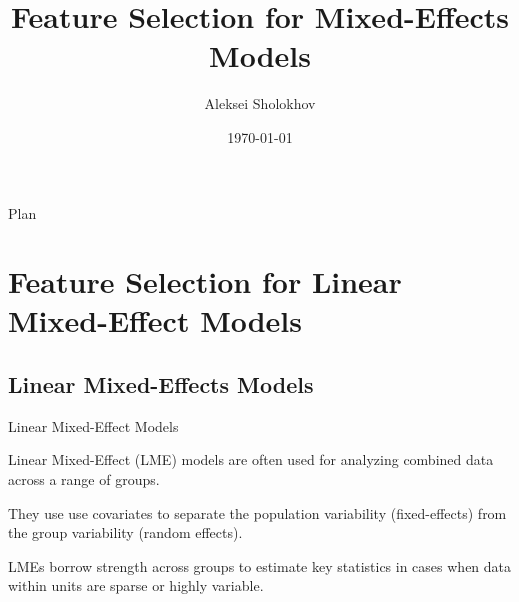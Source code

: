 \documentclass[8pt]{beamer}
\title{Feature Selection for Mixed-Effects Models}
\date{\today}
\author{Aleksei Sholokhov}
\begin{document}
\maketitle

\begin{frame}{Plan}
	\tableofcontents
\end{frame}

\section{Feature Selection for Linear Mixed-Effect Models}
\subsection{Linear Mixed-Effects Models}
\begin{frame}{Linear Mixed-Effect Models}

Linear Mixed-Effect (LME) models are often used for analyzing combined data across a range of groups. \newline

They use use covariates to separate the population variability (fixed-effects) from the group variability (random effects). \newline

LMEs borrow strength across groups to estimate key statistics in cases when data within units are sparse or highly variable. \newline

\end{frame}
\end{document}

